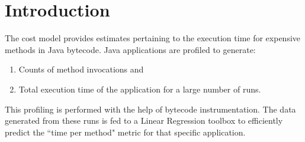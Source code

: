 \chapter{Introduction}
\label{introchap}

The cost model provides estimates pertaining to the execution time for expensive methods in Java bytecode. Java applications are profiled to generate: 
\begin{enumerate}
\item Counts of method invocations and 
\item Total execution time of the application for a large number of runs. 
\end{enumerate}
This profiling is performed with the help of bytecode instrumentation. The data generated from these runs is fed to a Linear Regression toolbox to efficiently predict the ``time per method" metric for that specific application.

